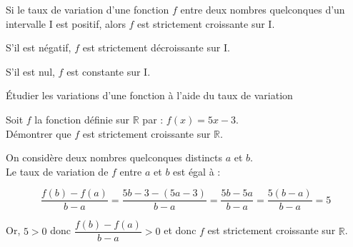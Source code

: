 \begin{bprops}
	\begin{itemProp}
		\item Si le taux de variation d'une fonction \(f\) entre deux nombres quelconques d'un intervalle I est positif, alors \(f\) est strictement croissante sur I.
		\item S'il est négatif, \(f\) est strictement décroissante sur I.
		\item S'il est nul, \(f\) est constante sur I.
	\end{itemProp}
\end{bprops}

\begin{bmethodet}{Étudier les variations d'une fonction à l'aide du taux de variation}
	
	Soit \(f\) la fonction définie sur \(\mathbb{R}\) par : \(f(x)=5 x-3\).\\
	Démontrer que \(f\) est strictement croissante sur \(\mathbb{R}\).
	
	
	On considère deux nombres quelconques distincts \(a\) et \(b\).\\
	Le taux de variation de \(f\) entre \(a\) et \(b\) est égal à :
	
	\[
	\frac{f(b)-f(a)}{b-a}=\frac{5 b-3-(5 a-3)}{b-a}=\frac{5 b-5 a}{b-a}=\frac{5(b-a)}{b-a}=5
	\]
	
	Or, \(5>0\) donc \(\dfrac{f(b)-f(a)}{b-a}>0\) et donc \(f\) est strictement croissante sur \(\mathbb{R}\).	
\end{bmethodet}
